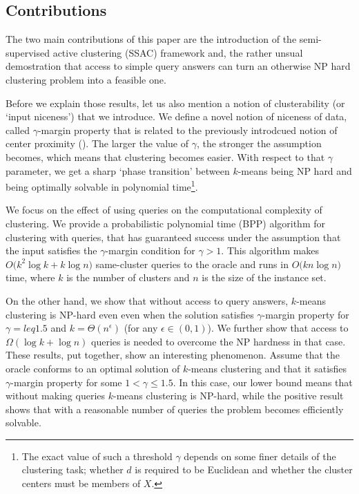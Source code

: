 \documentclass{article}
\begin{document}
\subsection{Contributions}
The two main contributions of this paper are the introduction of the semi-supervised active clustering (SSAC) framework and, the rather unsual 
demostration that access to simple query answers can turn an otherwise NP hard clustering problem into a feasible one. 

Before we explain those results, let us also mention a notion of clusterability (or `input niceness') that we introduce. We define a novel notion of niceness of data, called $\gamma$-margin property that is related to the previously introdcued notion of center proximity (\cite{awasthi2012center}). The larger the value of $\gamma$, the stronger the assumption becomes, which means that clustering becomes easier. With respect to that $\gamma$ parameter, we get a sharp `phase transition' between $k$-means being NP hard and being optimally solvable in polynomial time\footnote{The exact value of such a threshold $\gamma$ depends on some finer details of the clustering task; whether $d$ is required to be Euclidean and whether the cluster centers must be members of $X$.}.

We focus on the effect of using queries on the computational complexity of clustering. We provide a probabilistic polynomial time (BPP) algorithm for clustering with queries, that has guaranteed success under the assumption that the input satisfies the $\gamma$-margin condition for $\gamma > 1$. This algorithm makes $O\big(k^2\log k + k\log n)$ same-cluster queries to the oracle and runs in $O\big(kn\log n)$ time, where $k$ is the number of clusters and $n$ is the size of the instance set.

On the other hand, we show that without access to query answers, $k$-means clustering is NP-hard even even when the solution satisfies $\gamma$-margin property for $\gamma=leq 1.5$ and $k=\Theta(n^\epsilon)$ (for any $\epsilon\in (0,1)$). We further show that access to $\Omega(\log k + \log n)$ queries is needed to overcome the NP hardness in that case.
These results, put together, show an interesting phenomenon. Assume that the oracle conforms to an optimal solution of $k$-means clustering and that it satisfies $\gamma$-margin property for some $1<\gamma \leq 1.5$. In this case, our lower bound means that without making queries $k$-means clustering is NP-hard, while the positive result shows that with a reasonable number of queries the problem becomes efficiently solvable.  
\end{document}
